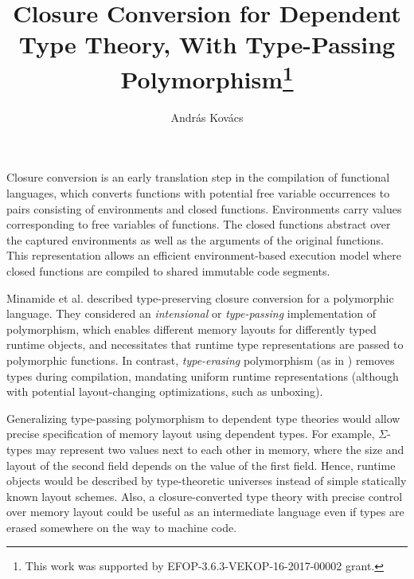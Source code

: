 \documentclass[a4paper]{easychair}
\begin{document}

\title{Closure Conversion for Dependent Type Theory, With Type-Passing Polymorphism\footnote{This work was supported by EFOP-3.6.3-VEKOP-16-2017-00002 grant.}}


\author{
  Andr{\'a}s Kov{\'a}cs
}



\clearpage

\maketitle



\pagestyle{empty}


Closure conversion is an early translation step in the compilation of
functional languages, which converts functions with potential free
variable occurrences to pairs consisting of environments and closed
functions. Environments carry values corresponding to free variables
of functions. The closed functions abstract over the captured
environments as well as the arguments of the original functions. This
representation allows an efficient environment-based execution model
where closed functions are compiled to shared immutable code segments.

Minamide et al. \cite{minamide1996typed} described type-preserving
closure conversion for a polymorphic language. They considered an
\emph{intensional} or \emph{type-passing} implementation of
polymorphism, which enables different memory layouts for differently
typed runtime objects, and necessitates that runtime type
representations are passed to polymorphic functions. In contrast,
\emph{type-erasing} polymorphism (as in \cite{morrisett1999system})
removes types during compilation, mandating uniform runtime
representations (although with potential layout-changing
optimizations, such as unboxing).

Generalizing type-passing polymorphism to dependent type theories
would allow precise specification of memory layout using dependent
types. For example, $\Sigma$-types may represent two values next to
each other in memory, where the size and layout of the second field
depends on the value of the first field. Hence, runtime objects would
be described by type-theoretic universes instead of simple statically
known layout schemes. Also, a closure-converted type theory with
precise control over memory layout could be useful as an intermediate
language even if types are erased somewhere on the way to machine
code.
\end{document}
